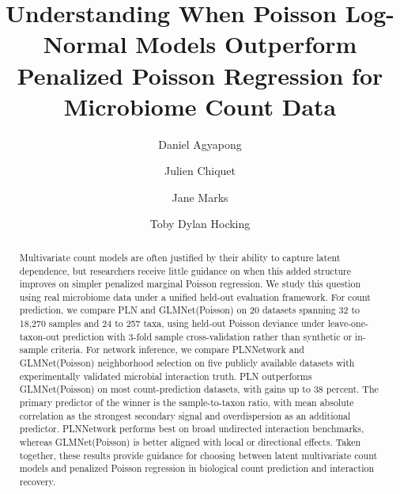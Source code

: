 \documentclass[a4paper,fleqn,longmktitle]{cas-sc}
\begin{document}
\let\WriteBookmarks\relax
\def\floatpagepagefraction{1}
\def\textpagefraction{.001}


\title[mode=title]{Understanding When Poisson Log-Normal Models Outperform Penalized Poisson Regression for Microbiome Count Data}

\author[1]{Daniel Agyapong}
\cormark[1]

\author[2]{Julien Chiquet}

\author[3]{Jane Marks}

\author[4]{Toby Dylan Hocking}






\begin{abstract}
Multivariate count models are often justified by their ability to capture latent dependence, but researchers receive little guidance on when this added structure improves on simpler penalized marginal Poisson regression.
We study this question using real microbiome data under a unified held-out evaluation framework.
For count prediction, we compare PLN and GLMNet(Poisson) on 20 datasets spanning 32 to 18,270 samples and 24 to 257 taxa, using held-out Poisson deviance under leave-one-taxon-out prediction with 3-fold sample cross-validation rather than synthetic or in-sample criteria.
For network inference, we compare PLNNetwork and GLMNet(Poisson) neighborhood selection on five publicly available datasets with experimentally validated microbial interaction truth.
PLN outperforms GLMNet(Poisson) on most count-prediction datasets, with gains up to 38 percent.
The primary predictor of the winner is the sample-to-taxon ratio, with mean absolute correlation as the strongest secondary signal and overdispersion as an additional predictor.
PLNNetwork performs best on broad undirected interaction benchmarks, whereas GLMNet(Poisson) is better aligned with local or directional effects.
Taken together, these results provide guidance for choosing between latent multivariate count models and penalized Poisson regression in biological count prediction and interaction recovery.
\end{abstract}
\end{document}
